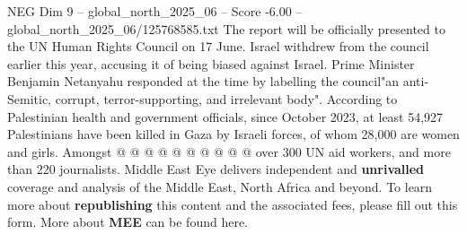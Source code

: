 \begin{textsample}{NEG Dim 9 – global\_north\_2025\_06 – Score -6.00 – global\_north\_2025\_06/125768585.txt}
The report will be officially presented to the UN Human Rights Council on 17 June.
Israel withdrew from the council earlier this year, accusing it of being biased against Israel.
Prime Minister Benjamin Netanyahu responded at the time by labelling the council"an anti-Semitic, corrupt, terror-supporting, and irrelevant body".
According to Palestinian health and government officials, since October 2023, at least 54,927 Palestinians have been killed in Gaza by Israeli forces, of whom 28,000 are women and girls.
Amongst @ @ @ @ @ @ @ @ @ @ over 300 UN aid workers, and more than 220 journalists.
Middle East Eye delivers independent and \textbf{unrivalled} coverage and analysis of the Middle East, North Africa and beyond.
To learn more about \textbf{republishing} this content and the associated fees, please fill out this form.
More about \textbf{MEE} can be found here.

\end{textsample}

